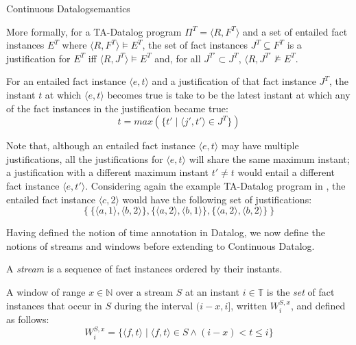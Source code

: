 \begin{nestedsection}{Continuous Datalog}{semantics}
\begin{definition}
More formally, for a TA-Datalog program $\Pi^T = \langle R, F^T \rangle$
and a set of entailed fact instances $E^T$ where $\langle R, F^T \rangle \models E^T$, the set of fact instances $J^T \subseteq F^T$ is a justification for
$E^T$ iff $\langle R, J^T \rangle \models E^T$ and, for all $J^{T\prime} \subset J^T$, $\langle R, J^{T\prime} \not\models E^T$.

For an entailed fact instance $\langle e, t\rangle$ and a
justification of that fact instance $J^T$, the instant $t$ at which
$\langle e, t \rangle$ becomes true is take to be the latest instant
at which any of the fact instances in the justification became true:
\[ t = max(\{ t' \mid \langle j', t' \rangle \in J^T \}) \]

Note that, although an entailed fact instance $\langle e, t\rangle$
may have multiple justifications, all the justifications for $\langle
e, t \rangle$ will share the same maximum instant; a justification
with a different maximum instant $t' \neq t$ would entail a different
fact instance $\langle e, t' \rangle$. Considering again the example
TA-Datalog program in ,
the entailed fact instance $\langle c, 2 \rangle$ would have the
following set of justifications:
\[
  \{ \ \{ \langle a, 1 \rangle, \langle b, 2 \rangle \},  \{ \langle a, 2 \rangle, \langle b, 1 \rangle \},  \{ \langle a, 2 \rangle, \langle b, 2 \rangle \} \  \}
\]

\end{definition}

Having defined the notion of time annotation in Datalog, we now define
the notions of streams and windows before extending to Continuous Datalog.

\begin{definition}[Streams]
A {\em stream} is a sequence of fact instances ordered
by their instants.
\end{definition}

\begin{definition}[Window]

A window of range ${x \in \mathbb{N}}$ over a stream $S$ at an instant
${i \in \mathbb{T}}$ is the \emph{set} of fact instances that occur in
$S$ during the interval ${(i-x,i]}$, written ${W^{S,x}_{i}}$, and
defined as follows:
\[ W^{S,x}_i = \{ \langle f, t \rangle \mid \langle f, t \rangle \in S \land (i-x) < t \leqslant i \}\]  
\end{definition}


\end{nestedsection}
